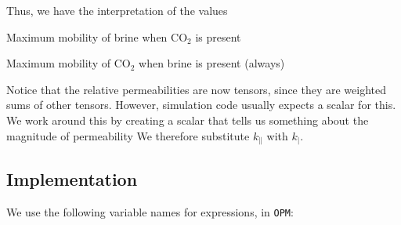 \documentclass[12pt]{scrartcl}
\newcommand{\mth}[1]{\ensuremath{#1}\xspace}
\newcommand{\wid}[1]{\widthof{\bfseries {#1} \hspace{\labelsep}}}
\newcommand{\COO}{\mth{\mathrm{CO}_2}}
\newcommand{\OPM}{{\tt OPM}}
\newcommand{\latr}[1]{{#1}_{\|}}                              %
\newcommand{\magn}[1]{{#1}_|}                                 %
\newcommand{\prm}{k}        %
\newcommand{\krnwr}{c}      %
\newcommand{\krwnr}{b}      %
\begin{document}
Thus, we have the interpretation of the values

\begin{description}[labelwidth=\wid{\( \krnwr \)}]
\item[ \( \krwnr \) ] Maximum mobility of brine when \COO is present
\item[ \( \krnwr \) ] Maximum mobility of \COO when brine is present (always)
\end{description}

Notice that the relative permeabilities are now tensors, since they are weighted sums of other tensors. However, simulation code usually expects a scalar for this. We work around this by creating a scalar that tells us something about the magnitude of permeability We therefore substitute \( \latr{ \prm } \) with \( \magn{ \prm } \).

\subsection{Implementation}

We use the following variable names for expressions, in \OPM:
\end{document}
